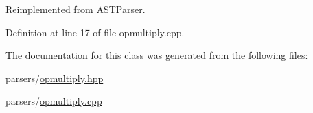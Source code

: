 Reimplemented from \hyperlink{class_a_s_t_parser_ab514c1a1b88592974cb6c2f94f482127}{A\+S\+T\+Parser}.



Definition at line 17 of file opmultiply.\+cpp.



The documentation for this class was generated from the following files\+:\begin{DoxyCompactItemize}
\item 
parsers/\hyperlink{opmultiply_8hpp}{opmultiply.\+hpp}\item 
parsers/\hyperlink{opmultiply_8cpp}{opmultiply.\+cpp}\end{DoxyCompactItemize}
